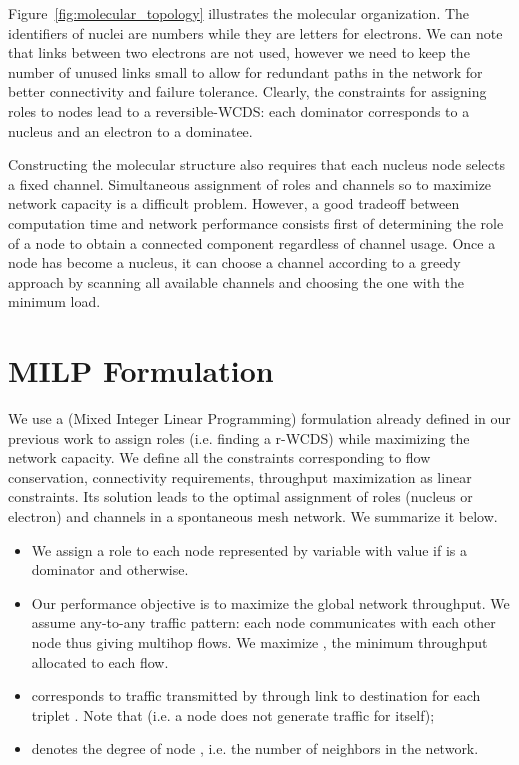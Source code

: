 \documentclass[twoside]{article}
\begin{document}
Figure~\ref{fig:molecular_topology} illustrates the molecular
organization. The identifiers of nuclei are numbers while they are
letters for electrons. We can note that links between two electrons
are not used, however we need to keep the number of unused links small
to allow for redundant paths in the network for better connectivity
and failure tolerance. 
Clearly, the constraints for assigning roles to nodes lead to a
reversible-WCDS: each dominator corresponds to a nucleus and an
electron to a dominatee.

Constructing the molecular structure also requires that each nucleus
node selects a fixed channel. Simultaneous assignment of roles and
channels so to maximize network capacity is a difficult
problem. However, a good tradeoff between computation time and network
performance consists first of determining the role of a node to obtain
a connected component regardless of channel usage. Once a node has
become a nucleus, it can choose a channel according to a greedy
approach by scanning all available channels and choosing the one with
the minimum load.













\section{MILP Formulation}
\label{section:milp}

We use a \milp(Mixed Integer Linear Programming) formulation already
defined in our previous work \cite{molecular_milp09rr} to assign roles
(i.e. finding a r-WCDS) while maximizing the network capacity.  We
define all the constraints corresponding to flow conservation,
connectivity requirements, throughput maximization as linear
constraints. Its solution leads to the optimal assignment of roles
(nucleus or electron) and channels in a spontaneous mesh network.  We
summarize it below.
\begin{itemize}
\item We assign a role to each node  represented by variable
   with value  if  is a dominator and 
  otherwise.
\item Our performance objective is to maximize the global network
  throughput. We assume any-to-any traffic pattern: each node
  communicates with each other node thus giving  multihop
  flows. We maximize , the minimum throughput allocated
  to each flow.
\item  corresponds to traffic transmitted by 
  through link  to destination  for each triplet . Note that  (i.e. a node does not generate traffic for itself);
\item  denotes the degree of node , i.e. the number of
  neighbors in the network.
\end{itemize}
\end{document}
